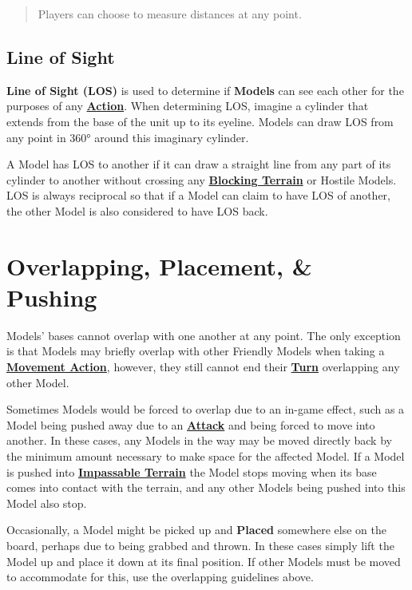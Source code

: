 \documentclass[
]{book}
\begin{document}
\begin{quote}
Players can choose to measure distances at any point.
\end{quote}

\hypertarget{los}{%
\subsection{Line of Sight}\label{los}}

\textbf{Line of Sight (LOS)} is used to determine if \textbf{Models} can see each other for the purposes of any \textbf{\protect\hyperlink{actions}{Action}}. When determining LOS, imagine a cylinder that extends from the base of the unit up to its eyeline. Models can draw LOS from any point in 360° around this imaginary cylinder.

A Model has LOS to another if it can draw a straight line from any part of its cylinder to another without crossing any \textbf{\protect\hyperlink{terrain}{Blocking Terrain}} or Hostile Models. LOS is always reciprocal so that if a Model can claim to have LOS of another, the other Model is also considered to have LOS back.

\hypertarget{overlap}{%
\section{Overlapping, Placement, \& Pushing}\label{overlap}}

Models' bases cannot overlap with one another at any point. The only exception is that Models may briefly overlap with other Friendly Models when taking a \textbf{\protect\hyperlink{actions}{Movement Action}}, however, they still cannot end their \textbf{\protect\hyperlink{turns}{Turn}} overlapping any other Model.

Sometimes Models would be forced to overlap due to an in-game effect, such as a Model being pushed away due to an \textbf{\protect\hyperlink{attacks}{Attack}} and being forced to move into another. In these cases, any Models in the way may be moved directly back by the minimum amount necessary to make space for the affected Model. If a Model is pushed into \textbf{\protect\hyperlink{terrain}{Impassable Terrain}} the Model stops moving when its base comes into contact with the terrain, and any other Models being pushed into this Model also stop.

Occasionally, a Model might be picked up and \textbf{Placed} somewhere else on the board, perhaps due to being grabbed and thrown. In these cases simply lift the Model up and place it down at its final position. If other Models must be moved to accommodate for this, use the overlapping guidelines above.
\end{document}
